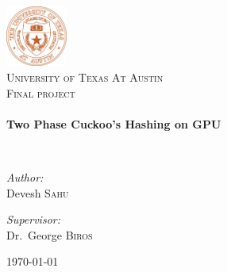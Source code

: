 \begin{titlepage}
\begin{center}

\includegraphics[width=0.15\textwidth]{utlogo.jpg}~\\[1cm]

\textsc{\LARGE University of Texas At Austin}\\[1.5cm]

\textsc{\Large Final project}\\[0.5cm]

\HRule \\[0.4cm]
{ \huge \bfseries Two Phase Cuckoo's Hashing on GPU \\[0.4cm] }

\HRule \\[1.5cm]

\noindent
\begin{minipage}[t]{0.4\textwidth}
\begin{flushleft} \large
\emph{Author:}\\
Devesh \textsc{Sahu}
\end{flushleft}
\end{minipage}%
\begin{minipage}[t]{0.4\textwidth}
\begin{flushright} \large
\emph{Supervisor:} \\
Dr.~George \textsc{Biros}
\end{flushright}
\end{minipage}

\vfill

{\large \today}

\end{center}
\end{titlepage}
